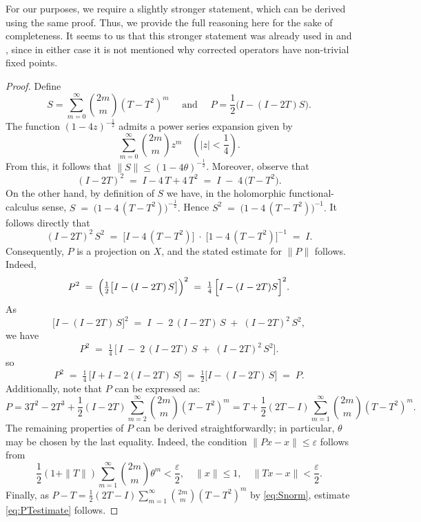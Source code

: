 \documentclass[12pt,fleqn]{amsart}
\renewcommand{\leq}{\leqslant}
\theoremstyle{definition}
\theoremstyle{remark}
\begin{document}
For our purposes, we require a slightly stronger statement, which can be derived using the same proof. Thus, we provide the full reasoning here for the sake of completeness. It seems to us that this stronger statement was already used in \cite[Theorem 3.7]{CasazzaKalton} and \cite{GhaFund}, since in either case it is not mentioned why corrected operators have non-trivial fixed points.
%
\begin{proof}
Define
\[
    S = \sum_{m=0}^\infty \binom{2m}{m} (T - T^2)^m\quad\text{ and }\quad P = \frac{1}{2}\big(I - (I - 2T)S\big).
\]
%
The function \((1 - 4z)^{-\frac{1}{2}}\) admits a power series expansion given by
\begin{equation}\label{eq:Snorm}
    \sum_{m=0}^\infty \binom{2m}{m} z^m \quad(|z| < \frac{1}{4}).
\end{equation}
From this, it follows that $\|S\| \leq (1 - 4\theta)^{-\frac{1}{2}}$. Moreover, observe that
\[
   (I - 2T)^2
   \;=\;
   I - 4\,T + 4\,T^2 
   \;=\;
   I \;-\; 4\,\bigl(T - T^2\bigr).
\]
On the other hand, by definition of $S$ we have, in the holomorphic functional-calculus sense,
\(
   S 
   \;=\; \bigl(1 - 4\,(T - T^2)\bigr)^{-\tfrac12}.
\)
Hence
\(
   S^2 
   \;=\; \bigl(1 - 4\,(T - T^2)\bigr)^{-1}.
\) 
It follows directly that
\[
   (I - 2T)^2 \, S^2 
   \;=\;
   \bigl[I - 4\,(T - T^2)\bigr] 
   \;\cdot\; \bigl[1 - 4\,(T - T^2)\bigr]^{-1}
   \;=\;
   I.
\]
Consequently, \(P\) is a projection on \(X\), and the stated estimate for \(\|P\|\) follows. Indeed,
\[
   P^2 
   \;=\; \Bigl(\tfrac12\bigl[I - (I - 2T)\,S\bigr]\Bigr)^2 
   \;=\; \tfrac14\,\Bigl[I - (I - 2T)S \Bigr]^2. 
\]
As
\[
   \bigl[I - (I - 2T)\,S\bigr]^2 
   \;=\; I \;-\; 2\,(I - 2T)\,S \;+\; (I - 2T)^2\,S^2,
\]
we have
\[
   P^2 
   \;=\; \tfrac14\,\bigl[\,
         I \;-\; 2\,(I - 2T)\,S \;+\; (I - 2T)^2\,S^2
      \bigr].
\]
so
\[
   P^2 
   \;=\; \tfrac14\,\bigl[I + I - 2(I - 2T)\,S\bigr] 
   \;=\; \tfrac12 \bigl[I - (I - 2T)\,S\bigr] 
   \;=\; P.
\]
Additionally, note that \(P\) can be expressed as:
\[
    P = 3T^2 - 2T^3 + \frac{1}{2}(I - 2T) \sum_{m=2}^\infty \binom{2m}{m} (T - T^2)^m = T + \frac{1}{2}(2T-I)\sum_{m=1}^\infty \binom{2m}{m} (T - T^2)^m.
\]
The remaining properties of \(P\) can be derived straightforwardly; in particular, $\theta$ may be chosen by the last equality. Indeed, the condition 
\(
    \|Px-x\|\leq \varepsilon
\)
follows from 
\[
    \frac{1}{2}(1+\|T\|)\sum_{m=1}^\infty \binom{2m}{m}\theta^m<\frac{\varepsilon}{2},\quad \|x\|\leq 1,\quad \|Tx - x\|<\frac\varepsilon2.
\]
%
Finally, as \(P-T=\frac{1}{2}(2T-I)\sum_{m=1}^\infty \binom{2m}{m} (T - T^2)^m\) by \eqref{eq:Snorm}, estimate \eqref{eq:PTestimate} follows.
\end{proof}
\end{document}
